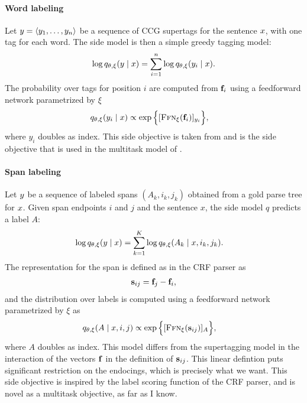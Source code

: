 \paragraph{Word labeling}
Let $y = \langle y_1, \dots, y_n \rangle$ be a sequence of CCG supertags for the sentence $x$, with one tag for each word. The side model is then a simple greedy tagging model:
\begin{align*}
  \log q_{\theta, \xi}(y \mid x)
    &= \sum_{i=1}^n \log q_{\theta, \xi}( y_i \mid x).  \\
\end{align*}
The probability over tags for position $i$ are computed from $\mathbf{f}_i$ using a feedforward network parametrized by $\xi$
\begin{align*}
  q_{\theta, \xi}( y_i \mid x) &\propto \exp \Big \{ [ \textsc{Ffn}_{\xi}( \mathbf{f}_{i} ) ]_{y_i} \Big\},
\end{align*}
where $y_i$ doubles as index. This side objective is taken from \citet{enguehard2017multitask} and is the side objective that is used in the multitask model of \citet{linzen2018targeted}.

\paragraph{Span labeling}
Let $y$ be a sequence of labeled spans $(A_k, i_k, j_k)$ obtained from a gold parse tree for $x$. Given span endpoints $i$ and $j$ and the sentence $x$, the side model $q$ predicts a label $A$:
\begin{align*}
  \log q_{\theta, \xi}(y \mid x)
    &= \sum_{k=1}^K \log q_{\theta, \xi}( A_k \mid x, i_k, j_k).
\end{align*}
The representation for the span is defined as in the CRF parser as
\begin{align*}
  \mathbf{s}_{ij} = \mathbf{f}_j - \mathbf{f}_i,
\end{align*}
and the distribution over labels is computed using a feedforward network parametrized by $\xi$ as
\begin{align*}
  q_{\theta, \xi}( A \mid x, i, j) &\propto \exp \Big \{ [ \textsc{Ffn}_{\xi}( \mathbf{s}_{ij} ) ]_{A} \Big\},
\end{align*}
where $A$ doubles as index. This model differs from the supertagging model in the interaction of the vectors $\mathbf{f}$ in the definition of $\mathbf{s}_{ij}$. This linear defintion puts significant restriction on the endocings, which is precisely what we want. This side objective is inspired by the label scoring function of the CRF parser, and is novel as a multitask objective, as far as I know.


